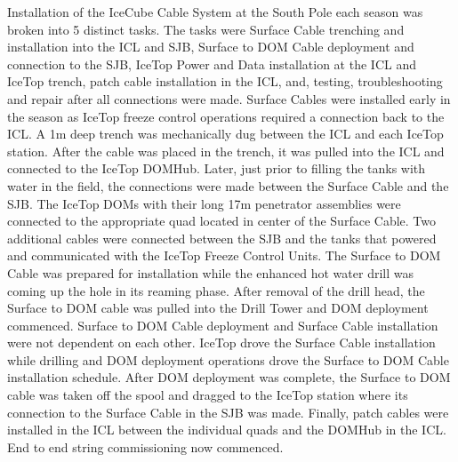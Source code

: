Installation of the IceCube Cable System at the South Pole each season was
broken into 5 distinct tasks. The tasks were Surface Cable trenching and
installation into the ICL and SJB, Surface to DOM Cable deployment and
connection to the SJB, IceTop Power and Data installation at the ICL and
IceTop trench, patch cable installation in the ICL, and, testing,
troubleshooting and repair after all connections were made. Surface Cables
were installed early in the season as IceTop freeze control operations
required a connection back to the ICL. A 1m deep trench was mechanically
dug between the ICL and each IceTop station. After the cable was placed in
the trench, it was pulled into the ICL and connected to the IceTop
DOMHub. Later, just prior to filling the tanks with water in the field, the
connections were made between the Surface Cable and the SJB. The IceTop
DOMs with their long 17m penetrator assemblies were connected to the
appropriate quad located in center of the Surface Cable. Two additional
cables were connected between the SJB and the tanks that powered and
communicated with the IceTop Freeze Control Units. The Surface to DOM Cable
was prepared for installation while the enhanced hot water drill was coming
up the hole in its reaming phase. After removal of the drill head, the
Surface to DOM cable was pulled into the Drill Tower and DOM deployment
commenced. Surface to DOM Cable deployment and Surface Cable installation
were not dependent on each other. IceTop drove the Surface Cable
installation while drilling and DOM deployment operations drove the Surface
to DOM Cable installation schedule. After DOM deployment was complete, the
Surface to DOM cable was taken off the spool and dragged to the IceTop
station where its connection to the Surface Cable in the SJB was
made. Finally, patch cables were installed in the ICL between the
individual quads and the DOMHub in the ICL. End to end string commissioning
now commenced.
